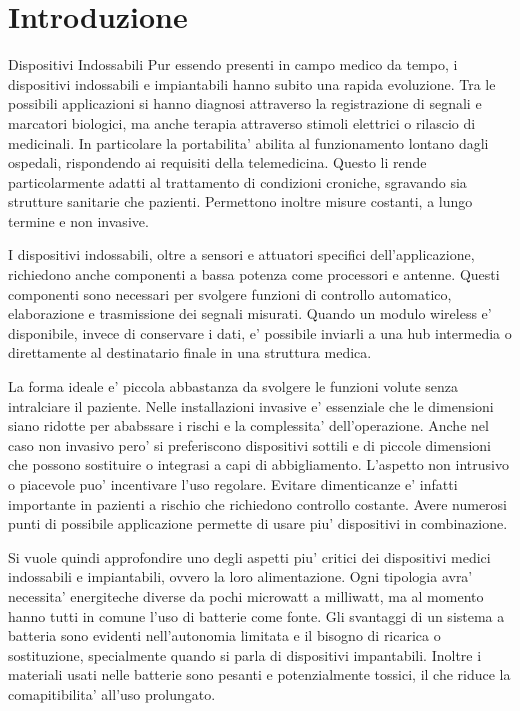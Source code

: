 \chapter{Introduzione}
\begin{multicols}{2}



\begin{section}{Dispositivi Indossabili}
    Pur essendo presenti in campo medico da tempo, i dispositivi indossabili e impiantabili hanno subito una rapida evoluzione. Tra le possibili applicazioni si hanno diagnosi attraverso la registrazione di segnali e marcatori biologici, ma anche terapia attraverso stimoli elettrici o rilascio di medicinali. In particolare la portabilita' abilita al funzionamento lontano dagli ospedali, rispondendo ai requisiti della telemedicina. Questo li rende particolarmente adatti al trattamento di condizioni croniche, sgravando sia strutture sanitarie che pazienti. Permettono inoltre misure costanti, a lungo termine e non invasive. 

    I dispositivi indossabili, oltre a sensori e attuatori specifici dell'applicazione, richiedono anche componenti a bassa potenza come processori e antenne. Questi componenti sono necessari per svolgere funzioni di controllo automatico, elaborazione e trasmissione dei segnali misurati. Quando un modulo wireless e' disponibile, invece di conservare i dati, e' possibile inviarli a una hub intermedia o direttamente al destinatario finale in una struttura medica.

    La forma ideale e' piccola abbastanza da svolgere le funzioni volute senza intralciare il paziente. Nelle installazioni invasive e' essenziale che le dimensioni siano ridotte per ababssare i rischi e la complessita' dell'operazione. Anche nel caso non invasivo pero' si preferiscono dispositivi sottili e di piccole dimensioni che possono sostituire o integrasi a capi di abbigliamento. L'aspetto non intrusivo o piacevole puo' incentivare l'uso regolare. Evitare dimenticanze e' infatti importante in pazienti a rischio che richiedono controllo costante. Avere numerosi punti di possibile applicazione permette di usare piu' dispositivi in combinazione.
    
    Si vuole quindi approfondire uno degli aspetti piu' critici dei dispositivi medici indossabili e impiantabili, ovvero la loro alimentazione. Ogni tipologia avra' necessita' energiteche diverse da pochi microwatt a milliwatt, ma al momento hanno tutti in comune l'uso di batterie come fonte. Gli svantaggi di un sistema a batteria sono evidenti nell'autonomia limitata e il bisogno di ricarica o sostituzione, specialmente quando si parla di dispositivi impantabili. Inoltre i materiali usati nelle batterie sono pesanti e potenzialmente tossici, il che riduce la comapitibilita' all'uso prolungato.
\end{section}


\end{multicols}
